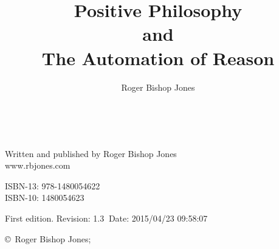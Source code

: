 \documentclass[10pt,titlepage]{book}
\title{Positive Philosophy\\ and\\ The Automation of Reason}
\author{Roger Bishop Jones}
\date{\ }
\begin{document}
\frontmatter

\begin{titlepage}
\maketitle


\hspace{2in}

\vfill

\begin{centering}

Written and published by Roger Bishop Jones\\
www.rbjones.com\\
\vspace{0.2in}

ISBN-13: 978-1480054622\\
ISBN-10: 1480054623

\vspace{0.2in}

{\footnotesize

First edition. $ $Revision: 1.3 $~$Date: 2015/04/23 09:58:07 $ $

\vspace{0.2in}

\copyright\ Roger Bishop Jones;

}%

\end{centering}

\thispagestyle{empty}

\end{titlepage}
\end{document}
